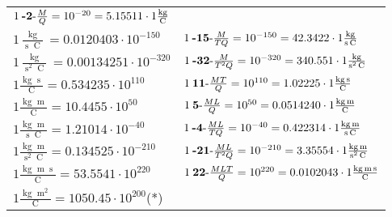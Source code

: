 \begin{center}
\begin{longtable}{l l}
	{\color{black}$1\:\text{\textbf{-2}-} \frac{M}{Q}=10^{-20} = 5.15511 \cdot 1 \bm{\mathrm{ }}\frac{\operatorname{kg}}{\operatorname{C}}$}\\
{\color{black}$1 \bm{\mathrm{ }}\frac{\operatorname{kg}}{\operatorname{s}\operatorname{C}} = 0.0120403\cdot10^{-150} $}&
	{\color{black}$1\:\text{\textbf{-15}-} \frac{M}{TQ}=10^{-150} = 42.3422 \cdot 1 \bm{\mathrm{ }}\frac{\operatorname{kg}}{\operatorname{s}\operatorname{C}}$}\\
{\color{black}$1 \bm{\mathrm{ }}\frac{\operatorname{kg}}{\operatorname{s}^2\operatorname{C}} = 0.00134251\cdot10^{-320} $}&
	{\color{black}$1\:\text{\textbf{-32}-} \frac{M}{T^2Q}=10^{-320} = 340.551 \cdot 1 \bm{\mathrm{ }}\frac{\operatorname{kg}}{\operatorname{s}^2\operatorname{C}}$}\\
{\color{black}$1 \bm{\mathrm{ }}\frac{\operatorname{kg}\operatorname{s}}{\operatorname{C}} = 0.534235\cdot10^{110} $}&
	{\color{black}$1\:\text{\textbf{11}-} \frac{MT}{Q}=10^{110} = 1.02225 \cdot 1 \bm{\mathrm{ }}\frac{\operatorname{kg}\operatorname{s}}{\operatorname{C}}$}\\
{\color{black}$1 \bm{\mathrm{ }}\frac{\operatorname{kg}\operatorname{m}}{\operatorname{C}} = 10.4455\cdot10^{50} $}&
	{\color{black}$1\:\text{\textbf{5}-} \frac{ML}{Q}=10^{50} = 0.0514240 \cdot 1 \bm{\mathrm{ }}\frac{\operatorname{kg}\operatorname{m}}{\operatorname{C}}$}\\
{\color{black}$1 \bm{\mathrm{ }}\frac{\operatorname{kg}\operatorname{m}}{\operatorname{s}\operatorname{C}} = 1.21014\cdot10^{-40} $}&
	{\color{black}$1\:\text{\textbf{-4}-} \frac{ML}{TQ}=10^{-40} = 0.422314 \cdot 1 \bm{\mathrm{ }}\frac{\operatorname{kg}\operatorname{m}}{\operatorname{s}\operatorname{C}}$}\\
{\color{black}$1 \bm{\mathrm{ }}\frac{\operatorname{kg}\operatorname{m}}{\operatorname{s}^2\operatorname{C}} = 0.134525\cdot10^{-210} $}&
	{\color{black}$1\:\text{\textbf{-21}-} \frac{ML}{T^2Q}=10^{-210} = 3.35554 \cdot 1 \bm{\mathrm{ }}\frac{\operatorname{kg}\operatorname{m}}{\operatorname{s}^2\operatorname{C}}$}\\
{\color{black}$1 \bm{\mathrm{ }}\frac{\operatorname{kg}\operatorname{m}\operatorname{s}}{\operatorname{C}} = 53.5541\cdot10^{220} $}&
	{\color{black}$1\:\text{\textbf{22}-} \frac{MLT}{Q}=10^{220} = 0.0102043 \cdot 1 \bm{\mathrm{ }}\frac{\operatorname{kg}\operatorname{m}\operatorname{s}}{\operatorname{C}}$}\\
{\color{black}$1 \bm{\mathrm{ }}\frac{\operatorname{kg}\operatorname{m}^2}{\operatorname{C}} = 1050.45\cdot10^{200} $}\quad(*)&

\end{longtable}
\end{center}
